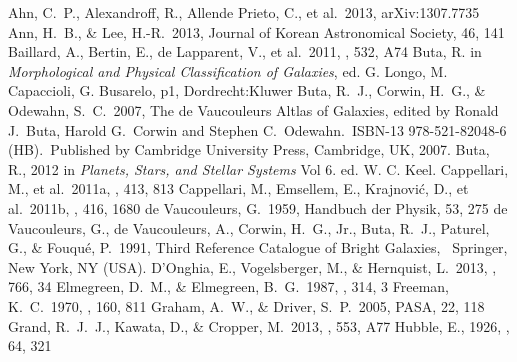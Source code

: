 \begin{thebibliography}{}
 Ahn, C.~P., Alexandroff,  R., Allende Prieto, C., et al.\ 2013, arXiv:1307.7735 %
 Ann, H.~B., \& Lee, H.-R.\ 2013, Journal of Korean Astronomical Society, 46, 141 %
 Baillard, A., Bertin, E., de Lapparent, V., et al.\ 2011, \aap, 532, A74 
 Buta, R. in {\it Morphological and Physical Classification of Galaxies}, ed. G. Longo, M. Capaccioli, G. Busarelo, p1, Dordrecht:Kluwer
 Buta, R.~J., Corwin, H.~G., \& Odewahn, S.~C.\ 2007, The de Vaucouleurs Altlas of Galaxies, edited by Ronald J.~Buta, Harold G.~Corwin and Stephen C.~Odewahn.~ISBN-13 978-521-82048-6 (HB).~Published by Cambridge University Press, Cambridge, UK, 2007.
 Buta, R., 2012 in {\it Planets, Stars, and Stellar Systems} Vol 6. ed. W. C. Keel. 
 Cappellari, M., et  al.\ 2011a, \mnras, 413, 813 
 Cappellari, M., Emsellem, E., Krajnovi{\'c}, D., et al.\ 2011b, \mnras, 416, 1680 
 de Vaucouleurs, G.\ 1959, Handbuch der Physik, 53, 275 
 de Vaucouleurs, G., de Vaucouleurs, A., Corwin, H.~G., Jr., Buta, R.~J., Paturel, G., \& Fouqu{\'e}, P.\ 1991, Third Reference Catalogue of Bright Galaxies,~ Springer, New York, NY (USA).
 D'Onghia, E., Vogelsberger, M., \& Hernquist, L.\ 2013, \apj, 766, 34 %
 Elmegreen, D.~M., \& Elmegreen, B.~G.\ 1987, \apj, 314, 3 %
 Freeman, K.~C.\ 1970, \apj, 160, 811  %
 Graham, A.~W., \& Driver, S.~P.\ 2005, PASA, 22, 118 %
 Grand, R.~J.~J., Kawata, D., \& Cropper, M.\ 2013, \aap, 553, A77  %
 Hubble, E., 1926, \apj, 64, 321 %

\end{thebibliography}
